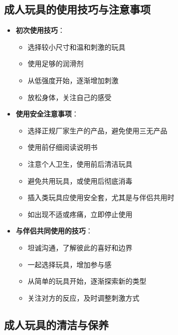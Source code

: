 \documentclass[12pt,UTF8]{ctexbook}
\begin{document}
\subsection{成人玩具的使用技巧与注意事项}

\begin{itemize}
	\item \textbf{初次使用技巧}：
	\begin{itemize}
		\item 选择较小尺寸和温和刺激的玩具
		\item 使用足够的润滑剂
		\item 从低强度开始，逐渐增加刺激
		\item 放松身体，关注自己的感受
	\end{itemize}
	\item \textbf{使用安全注意事项}：
	\begin{itemize}
		\item 选择正规厂家生产的产品，避免使用三无产品
		\item 使用前仔细阅读说明书
		\item 注意个人卫生，使用前后清洁玩具
		\item 避免共用玩具，或使用后彻底消毒
		\item 插入类玩具应使用安全套，尤其是与伴侣共用时
		\item 如出现不适或疼痛，立即停止使用
	\end{itemize}
	\item \textbf{与伴侣共同使用的技巧}：
	\begin{itemize}
		\item 坦诚沟通，了解彼此的喜好和边界
		\item 一起选择玩具，增加参与感
		\item 从简单的玩具开始，逐渐探索新的类型
		\item 关注对方的反应，及时调整刺激方式
	\end{itemize}
\end{itemize}

\subsection{成人玩具的清洁与保养}
\end{document}
